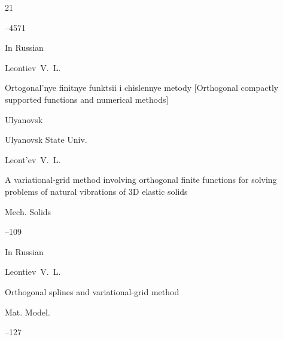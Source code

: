 \begin{thebibliography}{21}


--4571





\lang In Russian

\by Leontiev~V.~L. 

\book Ortogonal'nye finitnye funktsii i chislennye metody \rm [Orthogonal compactly supported functions and numerical methods]

\publaddr Ulyanovsk 

\publ Ulyanovsk State Univ.






\by Leont'ev~V.~L.

\paper A variational-grid method involving orthogonal finite functions for solving problems of natural vibrations of 3D elastic solids

\jour Mech. Solids



--109 





\lang In Russian

\by Leontiev~V.~L.

\paper Orthogonal splines and variational-grid method

\jour Mat. Model.



--127 












\end{thebibliography}
